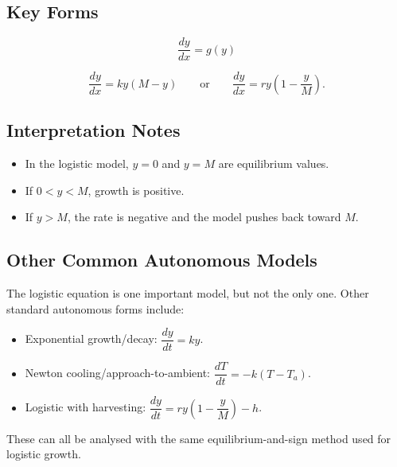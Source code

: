 \documentclass[12pt]{article}
\begin{document}
\subsection{Key Forms}
\[
\frac{dy}{dx}=g(y)
\]

\[
\frac{dy}{dx}=ky(M-y)
\qquad \text{or} \qquad
\frac{dy}{dx}=ry\left(1-\frac{y}{M}\right).
\]

\subsection{Interpretation Notes}
\begin{itemize}[leftmargin=*]
  \item In the logistic model, $y=0$ and $y=M$ are equilibrium values.
  \item If $0<y<M$, growth is positive.
  \item If $y>M$, the rate is negative and the model pushes back toward $M$.
\end{itemize}

\subsection{Other Common Autonomous Models}
The logistic equation is one important model, but not the only one. Other standard autonomous forms include:
\begin{itemize}[leftmargin=*]
  \item Exponential growth/decay: $\dfrac{dy}{dt}=ky$.
  \item Newton cooling/approach-to-ambient: $\dfrac{dT}{dt}=-k(T-T_a)$.
  \item Logistic with harvesting: $\dfrac{dy}{dt}=ry\left(1-\dfrac{y}{M}\right)-h$.
\end{itemize}
These can all be analysed with the same equilibrium-and-sign method used for logistic growth.

\end{document}
